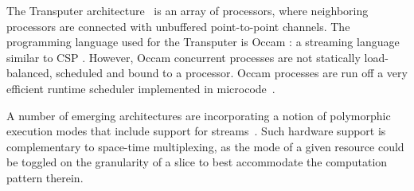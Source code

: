 The Transputer architecture~\cite{transputer88} is an array of
processors, where neighboring processors are connected with unbuffered
point-to-point channels.  The programming language used for the
Transputer is Occam \cite{occammanual}: a streaming language similar
to CSP \cite{Hoare78}.  However, Occam concurrent processes are not
statically load-balanced, scheduled and bound to a processor. Occam
processes are run off a very efficient runtime scheduler implemented
in microcode~\cite{may87communicating}.  

A number of emerging architectures are incorporating a notion of
polymorphic execution modes that include support for
streams~\cite{trips-isca03,smartmemories,m3t}.  Such hardware support
is complementary to space-time multiplexing, as the mode of a given
resource could be toggled on the granularity of a slice to best
accommodate the computation pattern therein.

%
